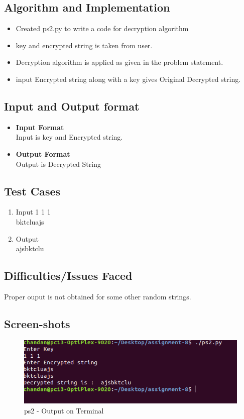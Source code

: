 \documentclass[a4paper,12pt]{article}
\begin{document}
	\newpage
	\subsection{Algorithm and Implementation}
	\begin{itemize}
		\item Created ps2.py to write a code for decryption algorithm 
		\item key and encrypted string is taken from user.
		\item Decryption algorithm is applied as given in the problem statement.
		\item input Encrypted string along with a key gives Original Decrypted string.
	\end{itemize}
	\subsection{Input and Output format}
	\begin{itemize}
		\item \textbf{Input Format}\\
		Input is key and Encrypted string.
		\item \textbf{Output Format}\\
		Output is Decrypted String
	\end{itemize}
	\subsection{Test Cases}
	\begin{enumerate}
		\item Input
		1 1 1\\
		bktcluajs\\
		\item Output \\
		ajsbktclu
		
	\end{enumerate}
	
	\subsection{Difficulties/Issues Faced}
	Proper ouput is not obtained for some other random strings.
	
	\newpage
	\subsection{Screen-shots}
	
	
	\begin{figure}[h]
	\includegraphics[scale=0.8]{ps2.png}
	\caption{ps2 - Output on Terminal}
	\label{fig:ps2}
	\end{figure}
\end{document}

